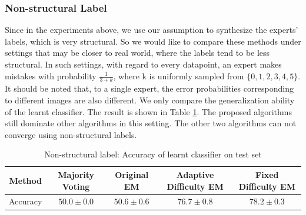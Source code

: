 \subsubsection{Non-structural Label}
Since in the experiments above, we use our assumption to synthesize the experts' labels, which is very structural. So we would like to compare these methods under settings that may be closer to real world, where the labels tend to be less structural. In such settings, with regard to every datapoint, an expert makes mistakes with probability $\frac{1}{3+k}$, where k is uniformly sampled from $\{0,1,2,3,4,5\}$. It should be noted that, to a single expert, the error probabilities corresponding to different images are also different. We only compare the generalization ability of the learnt classifier. The result is shown in Table \ref{table:rt}. The proposed algorithms still dominate other algorithms in this setting. The other two algorithms can not converge using non-structural labels.

\begin{table}[htp]
\caption{Non-structural label: Accuracy of learnt classifier on test set}
\label{table:rt}
\begin{center}
\begin{tabular}{c c c c c }
		\toprule
		Method & Majority Voting & Original EM & Adaptive Difficulty EM & Fixed Difficulty EM	 \\
		\midrule
        Accuracy & $50.0 \pm 0.0$  & $50.6 \pm 0.6$ & $76.7 \pm 0.8$ & $\bm{78.2 \pm 0.3}$ \\
		\bottomrule
\end{tabular}
\end{center}
\end{table}